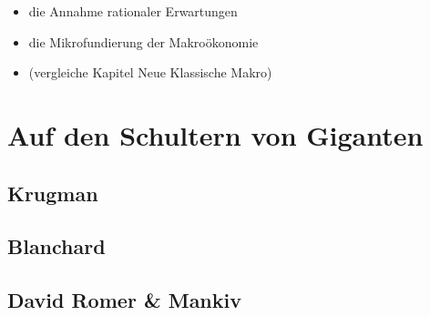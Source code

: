\begin{itemize}
	\item die Annahme rationaler Erwartungen
	\item die Mikrofundierung der Makroökonomie
	\item (vergleiche Kapitel Neue Klassische Makro)
\end{itemize}






\section{Auf den Schultern von Giganten}
\label{Giganten}

\subsection{Krugman}

\subsection{Blanchard}

\subsection{David Romer \& Mankiv}









